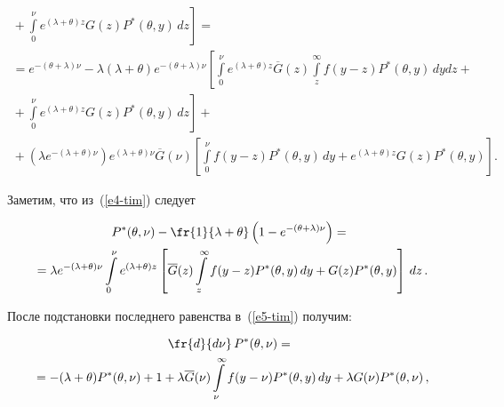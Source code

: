     \begin{multline}

\left.{}+\int\limits_0^\nu e^{(\lambda+\theta)z} G(z) P^*(\theta,y)\,dz\right]={}\\

    {}= e^{-(\theta+\lambda)\nu} -\lambda (\lambda+\theta) 

    e^{-(\theta+\lambda)\nu} \left[ \int\limits_0^\nu e^{(\lambda+\theta)z} \overline{G}(z) 

\int\limits_z^\infty f(y-z) P^*(\theta,y)\,dy dz+{}\right.\\

\left.{}+ \int\limits_0^\nu e^{(\lambda+\theta)z} 

G(z) P^*(\theta,y)\,dz \right]+{}\\

   \! {}+\left( \lambda e^{-(\lambda+\theta)\nu}\right) e^{(\lambda+\theta)\nu} 

\overline{G}(\nu)\! \left[ \int\limits_0^\nu\! f(y-z) P^*(\theta,y)\,dy 

+e^{(\lambda+\theta)z} G(z) P^*(\theta,y)\right]\!.\!\!\!\!

    \label{e5-tim}

    \end{multline}

    

    Заметим, что из~(\ref{e4-tim}) следует

    \begin{multline*}

    P^*(\theta,\nu) - \fr{1}{\lambda+\theta} \left( 1-e^{-(\theta+\lambda)\nu}\right) 

= {}\\

    {}=\lambda e^{-(\lambda+\theta)\nu} \int\limits_0^\nu e^{(\lambda+\theta)z} 

\left[ \overline{G}(z) \int\limits_z^\infty f(y-z) P^*(\theta,y)\,dy +G(z) P^* 

(\theta,y)\right]\,dz\,.

    \end{multline*}

    

    После подстановки последнего равенства в~(\ref{e5-tim}) получим:

    \begin{multline*}

    \fr{d}{d\nu}\,P^*(\theta,\nu) ={}\\

    {}=-(\lambda+\theta) P^*(\theta,\nu)+1+ \lambda 

\overline{G}(\nu) \int\limits_\nu^\infty f(y-\nu) P^*(\theta, y)\,dy 

+ \lambda G(\nu)  P^*(\theta,\nu)\,,

    \end{multline*}

